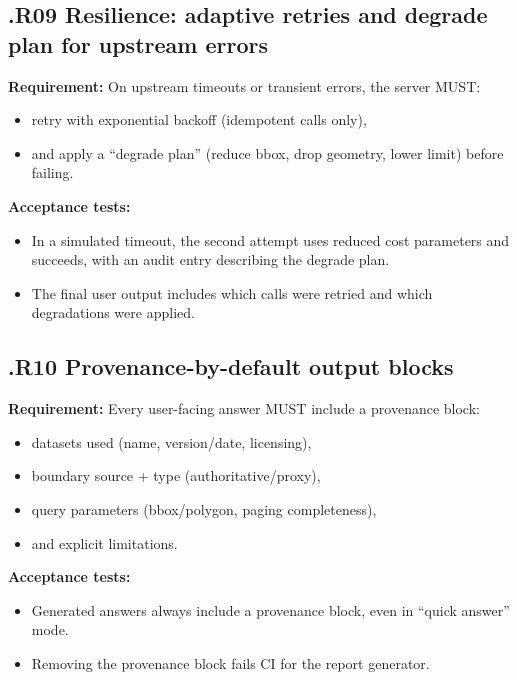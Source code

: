\subsection*{\thesection.R09 Resilience: adaptive retries and degrade plan for upstream errors}
\textbf{Requirement:} On upstream timeouts or transient errors, the server MUST: \cite{ncsc_secure_ai_guidelines,owasp_llm_top10}
\begin{itemize}[leftmargin=*]
\item retry with exponential backoff (idempotent calls only),
\item and apply a “degrade plan” (reduce bbox, drop geometry, lower limit) before failing.
\end{itemize}

\textbf{Acceptance tests:}
\begin{itemize}[leftmargin=*]
\item In a simulated timeout, the second attempt uses reduced cost parameters and succeeds, with an audit entry describing the degrade plan.
\item The final user output includes which calls were retried and which degradations were applied.
\end{itemize}

\subsection*{\thesection.R10 Provenance-by-default output blocks}
\textbf{Requirement:} Every user-facing answer MUST include a provenance block: \cite{prov_o,prov_dm,algorithmic_transparency_recording_standard,dcat3}
\begin{itemize}[leftmargin=*]
\item datasets used (name, version/date, licensing),
\item boundary source + type (authoritative/proxy),
\item query parameters (bbox/polygon, paging completeness),
\item and explicit limitations.
\end{itemize}

\textbf{Acceptance tests:}
\begin{itemize}[leftmargin=*]
\item Generated answers always include a provenance block, even in “quick answer” mode.
\item Removing the provenance block fails CI for the report generator.
\end{itemize}


